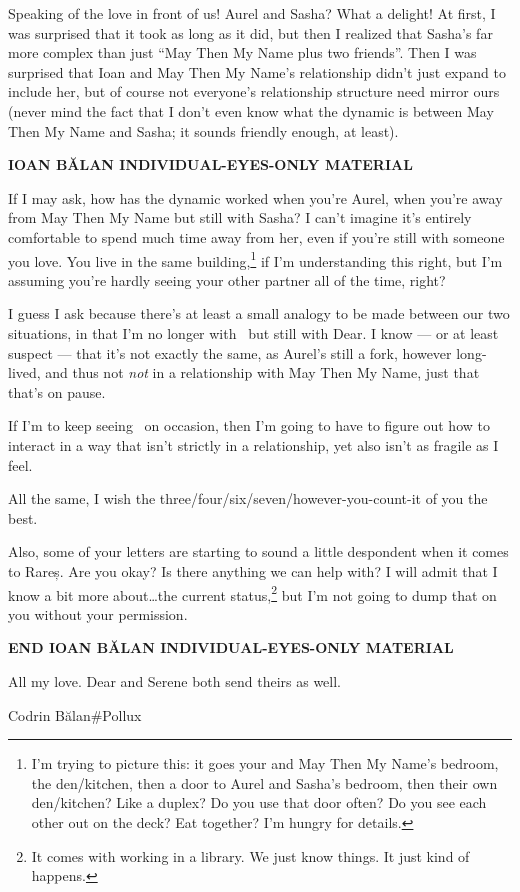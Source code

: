 Speaking of the love in front of us! Aurel and Sasha? What a delight! At first, I was surprised that it took as long as it did, but then I realized that Sasha's far more complex than just ``May Then My Name plus two friends''. Then I was surprised that Ioan and May Then My Name's relationship didn't just expand to include her, but of course not everyone's relationship structure need mirror ours (never mind the fact that I don't even know what the dynamic is between May Then My Name and Sasha; it sounds friendly enough, at least).

\begin{center}
\textbf{IOAN BĂLAN INDIVIDUAL-EYES-ONLY MATERIAL}
\end{center}

If I may ask, how has the dynamic worked when you're Aurel, when you're away from May Then My Name but still with Sasha? I can't imagine it's entirely comfortable to spend much time away from her, even if you're still with someone you love. You live in the same building,\footnote{I'm trying to picture this: it goes your and May Then My Name's bedroom, the den/kitchen, then a door to Aurel and Sasha's bedroom, then their own den/kitchen? Like a duplex? Do you use that door often? Do you see each other out on the deck? Eat together? I'm hungry for details.} if I'm understanding this right, but I'm assuming you're hardly seeing your other partner all of the time, right?

I guess I ask because there's at least a small analogy to be made between our two situations, in that I'm no longer with \Partner\ but still with Dear. I know — or at least suspect — that it's not exactly the same, as Aurel's still a fork, however long-lived, and thus not \emph{not} in a relationship with May Then My Name, just that that's on pause.

If I'm to keep seeing \Partner\ on occasion, then I'm going to have to figure out how to interact in a way that isn't strictly in a relationship, yet also isn't as fragile as I feel.

All the same, I wish the three/four/six/seven/however-you-count-it of you the best.

Also, some of your letters are starting to sound a little despondent when it comes to Rareș. Are you okay? Is there anything we can help with? I will admit that I know a bit more about\ldots the current status,\footnote{It comes with working in a library. We just know things. It just kind of happens.} but I'm not going to dump that on you without your permission.

\begin{center}
\textbf{END IOAN BĂLAN INDIVIDUAL-EYES-ONLY MATERIAL}
\end{center}

All my love. Dear and Serene both send theirs as well.

Codrin Bălan\#Pollux
